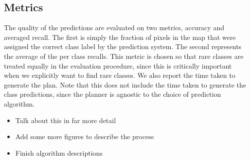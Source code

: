 

\subsection{Metrics}
The quality of the predictions are evaluated on two metrics, accuracy and averaged recall. The first is simply the fraction of pixels in the map that were assigned the correct class label by the prediction system. The second represents the average of the per class recalls. This metric is chosen so that rare classes are treated equally in the evaluation procedure, since this is critically important when we explicitly want to find rare classes. We also report the time taken to generate the plan. Note that this does not include the time taken to generate the class predictions, since the planner is agnostic to the choice of prediction algorithm.

 
 \begin{itemize}
     \item Talk about this in far more detail
     \item Add some more figures to describe the process
     \item Finish algorithm descriptions
 \end{itemize}